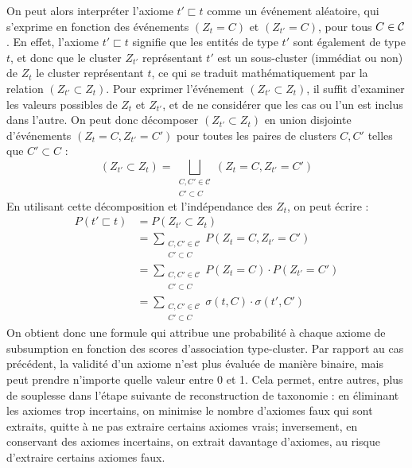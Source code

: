 On peut alors interpréter l'axiome $t' \sqsubset t$ comme un événement aléatoire, qui s'exprime en fonction des événements $(Z_t = C)$ et $(Z_{t'} = C)$, pour tous $C \in \mathcal{C}$.
En effet, l'axiome $t' \sqsubset t$ signifie que les entités de type $t'$ sont également de type $t$, et donc que le cluster $Z_{t'}$ représentant $t'$ est un sous-cluster (immédiat ou non) de $Z_t$ le cluster représentant $t$, ce qui se traduit mathématiquement par la relation $(Z_{t'} \subset Z_{t})$.
Pour exprimer l'événement $(Z_{t'} \subset Z_{t})$, il suffit d'examiner les valeurs possibles de $Z_t$ et $Z_{t'}$, et de ne considérer que les cas ou l'un est inclus dans l'autre. On peut donc décomposer $(Z_{t'} \subset Z_{t})$  en union disjointe d'événements $(Z_t = C, Z_{t'} = C')$ pour toutes les paires de clusters $C, C'$ telles que $C' \subset C$ :
\begin{equation}
    (Z_{t'} \subset Z_{t}) = \bigsqcup_{\substack{C, C' \in \mathcal{C} \\ C' \subset C}} (Z_t = C, Z_{t'} = C')
\end{equation}
%
%
En utilisant cette décomposition et l'indépendance des $Z_t$, on peut écrire :
\begin{align}
    \label{eq:softmapping_2}
    P(t' \sqsubset t) &= P(Z_{t'} \subset Z_{t}) \\
    &= \sum_{\substack{C, C' \in \mathcal{C} \\ C' \subset C}} P(Z_{t }= C, Z_{t'} = C') \nonumber \\
    &= \sum_{\substack{C, C' \in \mathcal{C} \\ C' \subset C}} P(Z_{t }= C)\cdot P(Z_{t'} = C') \\
    &= \sum_{\substack{C, C' \in \mathcal{C} \\ C' \subset C}} \sigma(t, C) \cdot \sigma(t', C')
\end{align}
On obtient donc une formule qui attribue une probabilité à chaque axiome de subsumption en fonction des scores d'association type-cluster. Par rapport au cas précédent, la validité d'un axiome n'est plus évaluée de manière binaire, mais peut prendre n'importe quelle valeur entre 0 et 1. Cela permet, entre autres, plus de souplesse dans l'étape suivante de reconstruction de taxonomie : en éliminant les axiomes trop incertains, on minimise le nombre d'axiomes faux qui sont extraits, quitte à ne pas extraire certains axiomes vrais; inversement, en conservant des axiomes incertains, on extrait davantage d'axiomes, au risque d'extraire certains axiomes faux.

